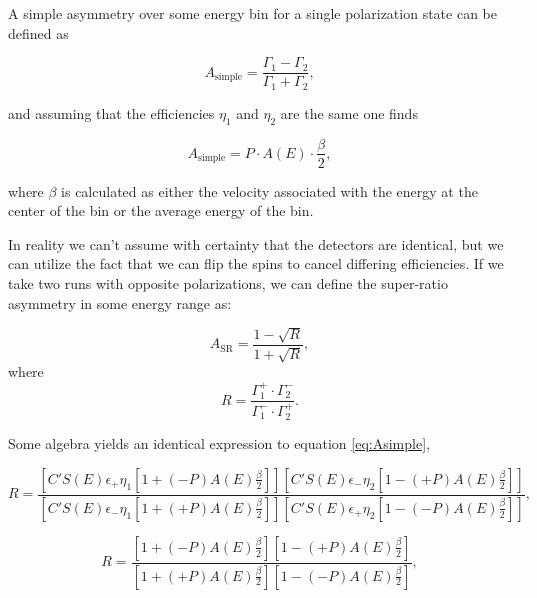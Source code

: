 A simple asymmetry over some energy bin for a single 
polarization state can be defined as

\begin{equation} 
A_{\mathrm{simple}} = \frac{\Gamma_1 - \Gamma_2}{\Gamma_1 + \Gamma_2}, 
\end{equation}

\noindent and assuming that the efficiencies $\eta_1$ and $\eta_2$ are the same one
finds

\begin{equation} \label{eq:Asimple}
A_{\mathrm{simple}} = P \cdot A(E) \cdot \frac{\beta}{2},
\end{equation}

\noindent where $\beta$ is calculated as either the velocity associated with the energy 
at the center of the bin or the average energy of the bin.   

In reality we can't assume with certainty that the detectors are identical, but we can 
utilize the fact that we can flip the spins to cancel differing efficiencies. If we 
take two runs with opposite polarizations, we can define the super-ratio asymmetry in 
some energy range as:

\begin{equation}
A_{\mathrm{SR}} = \frac{1-\sqrt{R}}{1+\sqrt{R}} ,
\end{equation}
\noindent where 
\begin{equation} \label{eq:finalA_SR}
 R = \frac{\Gamma_{1}^+ \cdot \Gamma_{2}^-}{\Gamma_{1}^- \cdot \Gamma_{2}^+}.
\end{equation}

Some algebra yields an identical expression to equation \ref{eq:Asimple},

\begin{equation*}
R = \frac{ \left[ C'  S(E)  \epsilon_{+}  \eta_{1} \left[ 1 + 
      \left(- P \right)  A(E) \frac{\beta}{2} \right] \right] 
\left[ C'  S(E)  \epsilon_{-}  \eta_{2} \left[ 1 - 
    \left(+ P \right)  A(E) \frac{\beta}{2} \right] \right] }
{ \left[ C'  S(E)  \epsilon_{-}  \eta_{1} \left[ 1 + 
      \left(+ P \right)  A(E) \frac{\beta}{2} \right] \right] 
\left[ C'  S(E)  \epsilon_{+}  \eta_{2} \left[ 1 - 
    \left(- P \right)  A(E) \frac{\beta}{2} \right] \right] },
\end{equation*}

\begin{equation*}
R = \frac{ \left[ 1 + \left(- P \right)  A(E) \frac{\beta}{2} \right] 
\left[ 1 - \left(+ P \right)  A(E) \frac{\beta}{2} \right]  }
{  \left[ 1 +  \left(+ P \right)  A(E) \frac{\beta}{2}  \right] 
 \left[ 1 -  \left(- P \right)  A(E) \frac{\beta}{2} \right]},
\end{equation*}

